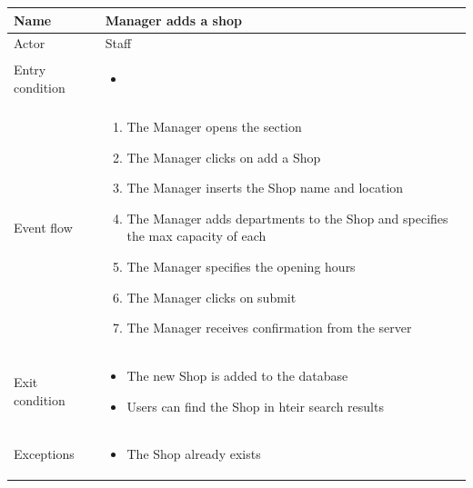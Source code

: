 \begin{table}[H]
    \begin{tabu} to \textwidth {|X|X[4]|}
        \hline
        Name            & Manager adds a shop        \\ \hline
        Actor           & Staff                      \\ \hline
        Entry condition & \begin{itemize}
            \item {}
        \end{itemize} \\ \hline
        Event flow      & \begin{enumerate}
            \item The Manager opens the  section
            \item The Manager clicks on add a Shop
            \item The Manager inserts the Shop name and location
            \item The Manager adds departments to the Shop and specifies the max capacity of each
            \item The Manager specifies the opening hours
            \item The Manager clicks on submit
            \item The Manager receives confirmation from the server
        \end{enumerate} \\ \hline
        Exit condition  & \begin{itemize}
            \item The new Shop is added to the database
            \item Users can find the Shop in hteir search results
        \end{itemize} \\ \hline
        Exceptions      & \begin{itemize}
            \item The Shop already exists
        \end{itemize} \\ \hline
    \end{tabu}
\end{table}

